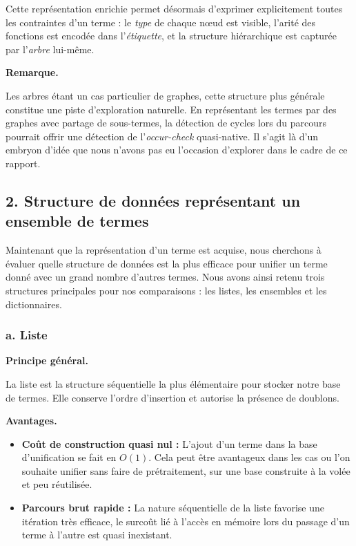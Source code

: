 \documentclass[11pt]{article}
\newenvironment{remarque}{%
    \begin{mdframed}[
        linecolor=sectioncolor!40,
        linewidth=0.8pt,
        backgroundcolor=sectioncolor!5,
        innerleftmargin=10pt,
        innerrightmargin=10pt,
        innertopmargin=6pt,
        innerbottommargin=6pt,
        skipabove=8pt,
        skipbelow=8pt
    ]
    \noindent\textbf{\small\color{sectioncolor}Remarque.}\enspace\small\itshape
}{%
    \end{mdframed}
}
\begin{document}
\vspace{0.2cm}
Cette représentation enrichie permet désormais d'exprimer explicitement toutes 
les contraintes d'un terme : le \textit{type} de chaque nœud est visible, l'arité des 
fonctions est encodée dans l'\textit{étiquette}, et la structure hiérarchique est 
capturée par l'\textit{arbre} lui-même.

\begin{remarque}
    Les arbres étant un cas particulier de graphes, cette structure plus 
    générale constitue une piste d'exploration naturelle. En représentant 
    les termes par des graphes avec partage de sous-termes, la détection 
    de cycles lors du parcours pourrait offrir une détection de 
    l'\emph{occur-check} quasi-native. Il s'agit là d'un embryon d'idée 
    que nous n'avons pas eu l'occasion d'explorer dans le cadre de ce rapport.
\end{remarque}

\newpage

\subsection*{2. Structure de données représentant un ensemble de termes}
\label{ensemble_termes}

Maintenant que la représentation d'un terme est acquise, nous cherchons à évaluer quelle structure de données est la plus efficace pour unifier un terme donné avec un grand nombre d'autres termes. Nous avons ainsi retenu trois structures principales pour nos comparaisons : les listes, les ensembles et les dictionnaires.

\subsubsection*{\hspace{4em}a. Liste}
\label{liste}

\vspace{0.4cm}

\noindent\textbf{Principe général.}

\vspace{0.2cm}
La liste est la structure séquentielle la plus élémentaire pour stocker notre base de termes. Elle conserve l'ordre d'insertion et autorise la présence de doublons. 

\vspace{0.4cm}
\noindent\textbf{Avantages.}

\begin{itemize}
    \item \textbf{Coût de construction quasi nul :} L'ajout d'un terme dans la base d'unification se fait en $O(1)$. Cela peut être avantageux dans les cas ou l'on souhaite unifier sans faire de prétraitement, sur une base construite à la volée et peu réutilisée.
    \item \textbf{Parcours brut rapide :} La nature séquentielle de la liste favorise une itération très efficace, le surcoût lié à l'accès en mémoire lors du passage d'un terme à l'autre est quasi inexistant.
\end{itemize}
\end{document}
